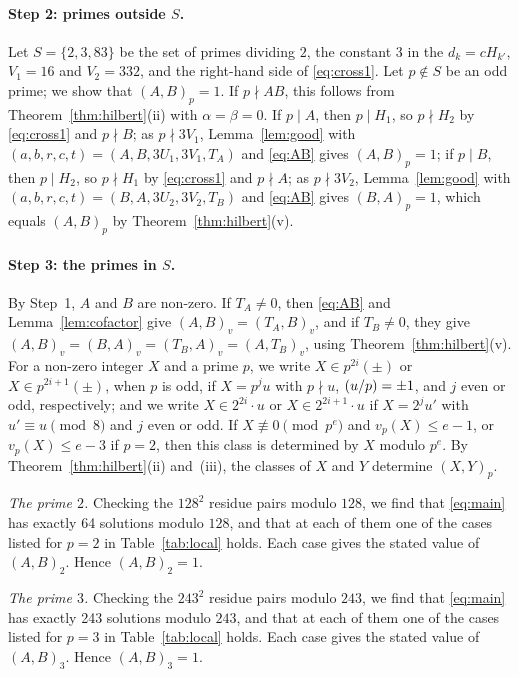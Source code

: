 \documentclass[11pt]{article}
\newcommand{\leg}[2]{\mathchoice{\biggl(\dfrac{#1}{#2}\biggr)}{(#1/#2)}{(#1/#2)}{(#1/#2)}}
\begin{document}
\paragraph{Step 2: primes outside $S$.} Let $S=\{2,3,83\}$ be the set of primes dividing $2$, the constant $3$ in the $d_k=cH_{k'}$, $V_{1}=16$ and $V_{2}=332$, and the right-hand side of \eqref{eq:cross1}. Let $p\notin S$ be an odd prime; we show that $(A,B)_p=1$. If $p\nmid AB$, this follows from Theorem~\ref{thm:hilbert}(ii) with $\alpha=\beta=0$. If $p\mid A$, then $p\mid H_{1}$, so $p\nmid H_{2}$ by \eqref{eq:cross1} and $p\nmid B$; as $p\nmid 3V_{1}$, Lemma~\ref{lem:good} with $(a,b,r,c,t)=(A,B,3U_{1},3V_{1},T_A)$ and \eqref{eq:AB} gives $(A,B)_p=1$; if $p\mid B$, then $p\mid H_{2}$, so $p\nmid H_{1}$ by \eqref{eq:cross1} and $p\nmid A$; as $p\nmid 3V_{2}$, Lemma~\ref{lem:good} with $(a,b,r,c,t)=(B,A,3U_{2},3V_{2},T_B)$ and \eqref{eq:AB} gives $(B,A)_p=1$, which equals $(A,B)_p$ by Theorem~\ref{thm:hilbert}(v).

\paragraph{Step 3: the primes in $S$.} By Step~1, $A$ and $B$ are non-zero. If $T_A\neq0$, then \eqref{eq:AB} and Lemma~\ref{lem:cofactor} give $(A,B)_v=(T_A,B)_v$, and if $T_B\neq0$, they give $(A,B)_v=(B,A)_v=(T_B,A)_v=(A,T_B)_v$, using Theorem~\ref{thm:hilbert}(v). For a non-zero integer $X$ and a prime $p$, we write $X\in p^{2i}(\pm)$ or $X\in p^{2i+1}(\pm)$, when $p$ is odd, if $X=p^ju$ with $p\nmid u$, $\leg{u}{p}=\pm1$, and $j$ even or odd, respectively; and we write $X\in2^{2i}\cdot u$ or $X\in2^{2i+1}\cdot u$ if $X=2^ju'$ with $u'\equiv u\pmod 8$ and $j$ even or odd. If $X\not\equiv0\pmod{p^e}$ and $v_p(X)\leq e-1$, or $v_p(X)\leq e-3$ if $p=2$, then this class is determined by $X$ modulo $p^e$. By Theorem~\ref{thm:hilbert}(ii) and~(iii), the classes of $X$ and $Y$ determine $(X,Y)_p$.

\emph{The prime $2$.} Checking the $128^2$ residue pairs modulo $128$, we find that \eqref{eq:main} has exactly 64 solutions modulo $128$, and that at each of them one of the cases listed for $p=2$ in Table~\ref{tab:local} holds. Each case gives the stated value of $(A,B)_{2}$. Hence $(A,B)_{2}=1$.

\emph{The prime $3$.} Checking the $243^2$ residue pairs modulo $243$, we find that \eqref{eq:main} has exactly 243 solutions modulo $243$, and that at each of them one of the cases listed for $p=3$ in Table~\ref{tab:local} holds. Each case gives the stated value of $(A,B)_{3}$. Hence $(A,B)_{3}=1$.
\end{document}

